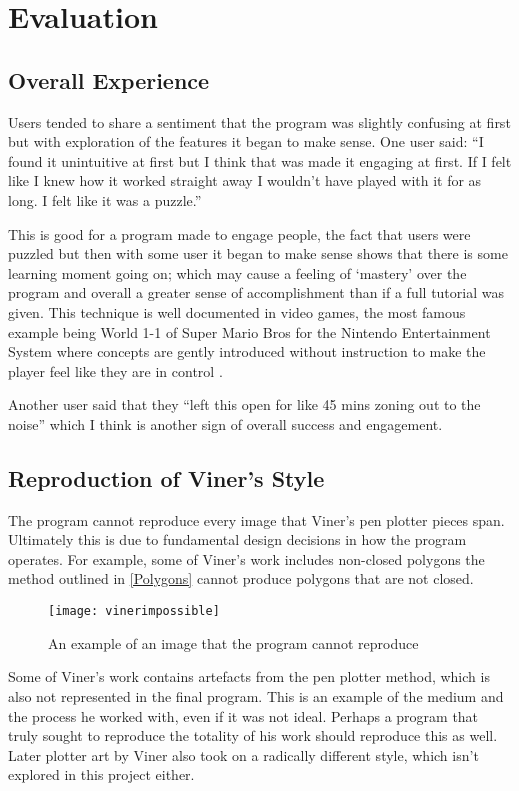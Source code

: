 \section{Evaluation}
\subsection{Overall Experience}
Users tended to share a sentiment that the program was slightly confusing at
first but with exploration of the features it began to make sense. One user
said: ``I found it unintuitive at first but I think that was made it engaging at
first. If I felt like I knew how it worked straight away I wouldn't have played
with it for as long. I felt like it was a puzzle.''

This is good for a program made to engage people, the fact that users were
puzzled but then with some user it began to make sense shows that there is some
learning moment going on; which may cause a feeling of `mastery' over the
program and overall a greater sense of accomplishment than if a full tutorial
was given. This technique is well documented in video games, the most famous
example being World 1-1 of Super Mario Bros for the Nintendo Entertainment
System where concepts are gently introduced without instruction to make the
player feel like they are in control \citep{miyamoto11}.

Another user said that they ``left this open for like 45 mins zoning out to the
noise'' which I think is another sign of overall success and engagement.

\subsection{Reproduction of Viner's Style}
The program cannot reproduce every image that Viner's pen plotter pieces span.
Ultimately this is due to fundamental design decisions in how the program
operates. For example, some of Viner's work includes non-closed polygons the
method outlined in \autoref{Polygons} cannot produce polygons that are not
closed. 

\begin{figure}[H]
    \centering
    \texttt{[image: vinerimpossible]}
    \caption{An example of an image that the program cannot reproduce}
\end{figure}

Some of Viner's work contains artefacts from the pen plotter method, which is
also not represented in the final program. This is an example of the medium and
the process he worked with, even if it was not ideal. Perhaps a program that
truly sought to reproduce the totality of his work should reproduce this as
well. Later plotter art by Viner also took on a radically different style, which
isn't explored in this project either.

